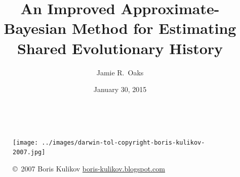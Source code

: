 

\newcommand{\allParameters}[1]{\ensuremath{\theta_{#1}}\xspace}



\title[Estimating shared history]{An Improved Approximate-Bayesian Method for Estimating Shared
Evolutionary History}

\author[J.\ Oaks]{
    Jamie R.\ Oaks
}

\date{January 30, 2015}


\begin{frame}
    \begin{columns}[c]
            \maketitle
            \begin{figure}
                \begin{center}
                \texttt{[image: ../images/darwin-tol-copyright-boris-kulikov-2007.jpg]}
                \caption{\tiny \copyright~2007 Boris Kulikov \href{http://boris-kulikov.blogspot.com/}{boris-kulikov.blogspot.com}}
                \end{center}
            \end{figure}
    \end{columns}
\end{frame}

